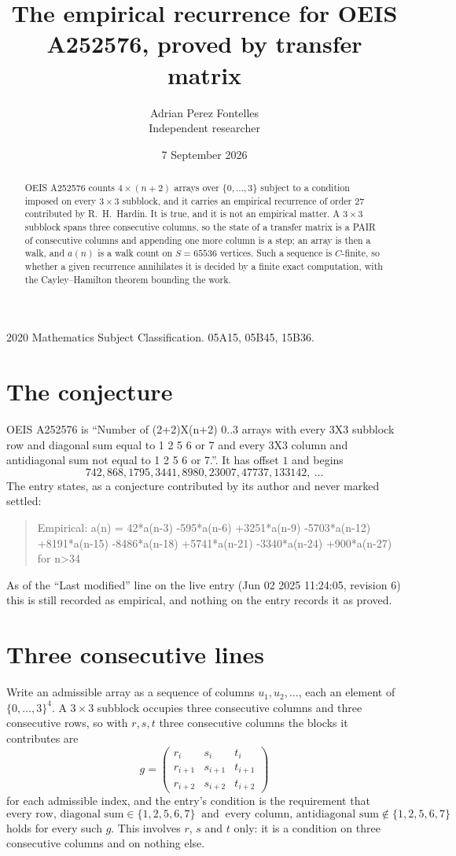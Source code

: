 \documentclass[11pt,a4paper]{article}
\title{The empirical recurrence for OEIS A252576, proved by transfer matrix}
\author{Adrian Perez Fontelles\\ \small Independent researcher}
\date{7 September 2026}
\theoremstyle{plain}
\theoremstyle{definition}
\begin{document}
\maketitle

\begin{abstract}
OEIS A252576 counts $4\times(n+2)$ arrays over $\{0,\dots,3\}$ subject to a condition imposed on
every $3\times3$ subblock, and it carries an empirical recurrence of order $27$
contributed by R.~H.~Hardin. It is true, and it is not an empirical matter. A $3\times3$
subblock spans three consecutive columns, so the state of a transfer matrix is a PAIR of
consecutive columns and appending one more column is a step; an array is then a walk, and
$a(n)$ is a walk count on $S=65536$ vertices. Such a sequence is $C$-finite, so whether a given
recurrence annihilates it is decided by a finite exact computation, with the Cayley--Hamilton
theorem bounding the work.
\end{abstract}

\noindent\small 2020 Mathematics Subject Classification. 05A15, 05B45, 15B36.\normalsize

\section{The conjecture}

OEIS A252576 is ``Number of (2+2)X(n+2) 0..3 arrays with every 3X3 subblock row and diagonal sum equal to 1 2 5 6 or 7 and every 3X3 column and antidiagonal sum not equal to 1 2 5 6 or 7.''. It has offset $1$ and begins
\[
742, 868, 1795, 3441, 8980, 23007, 47737, 133142,\ \dots
\]
The entry states, as a conjecture contributed by its author and never marked settled:
\begin{quote}
Empirical: a(n) = 42*a(n-3) -595*a(n-6) +3251*a(n-9) -5703*a(n-12) +8191*a(n-15) -8486*a(n-18) +5741*a(n-21) -3340*a(n-24) +900*a(n-27) for n>34
\end{quote}
As of the ``Last modified'' line on the live entry (Jun 02 2025 11:24:05, revision 6) this is still
recorded as empirical, and nothing on the entry records it as proved.

\section{Three consecutive lines}

Write an admissible array as a sequence of columns $u_1,u_2,\dots$, each an element of
$\{0,\dots,3\}^{4}$. A $3\times3$ subblock occupies three consecutive columns and
three consecutive rows, so with $r,s,t$ three consecutive columns the blocks it
contributes are
\[
g=\begin{pmatrix}r_i&s_i&t_i\\ r_{i+1}&s_{i+1}&t_{i+1}\\ r_{i+2}&s_{i+2}&t_{i+2}\end{pmatrix}
\]
for each admissible index, and the entry's condition is the requirement that
\[
\text{every row, diagonal sum} \in \{1,2,5,6,7\}\ \text{ and }\ \text{every column, antidiagonal sum} \notin \{1,2,5,6,7\}
\]
holds for every such $g$. This involves $r$, $s$ and $t$ only: it is a condition on
three consecutive columns and on nothing else.
\end{document}

